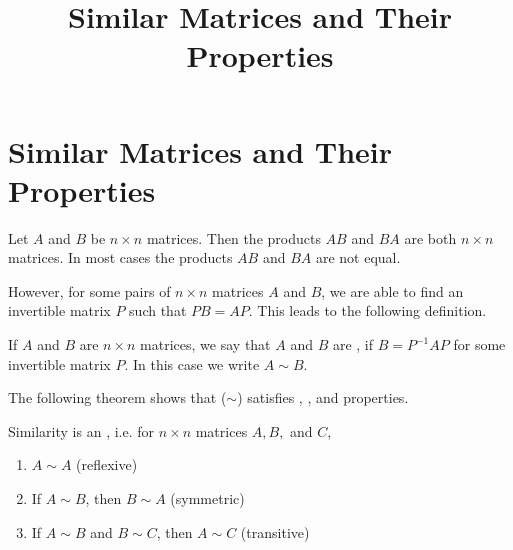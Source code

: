 \documentclass{ximera}
\title{Similar Matrices and Their Properties} \license{CC BY-NC-SA 4.0}
\begin{document}
\begin{abstract}
\end{abstract}
\maketitle

\section*{Similar Matrices and Their Properties}

Let $A$ and $B$ be $n \times n$ matrices.  Then the products $AB$ and $BA$ are both $n \times n$ matrices.  In most cases the products $AB$ and $BA$ are not equal.

However, for some pairs of $n \times n$ matrices $A$ and $B$, we are able to find an invertible matrix $P$ such that $PB = AP$.  This leads to the following definition.

\begin{definition}
If $A$ and $B$ are $n \times n$ matrices, we say that $A$ and $B$ are , if $B = P^{-1}AP$ for some invertible matrix $P$.  In this case we write $A \sim B$.
\end{definition}


 
The following theorem shows that  ($\sim$) satisfies , , and  properties.  %

\begin{theorem}\label{th:{similarityequivalence}}
Similarity is an , i.e. for $n \times n$ matrices $A,B,$ and $C$,
\begin{enumerate}
\item\label{item:reflexive} $A \sim A$ (reflexive)
\item\label{item:symmetric} If $A \sim B$, then $B \sim A$ (symmetric)
\item\label{item:transitive} If $A \sim B$ and $B \sim C$, then $A \sim C$ (transitive)
\end{enumerate}
\end{theorem}
\end{document}
